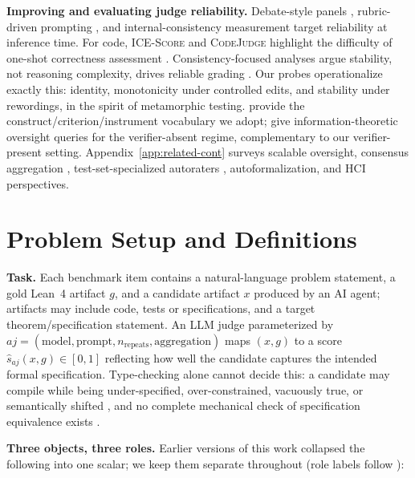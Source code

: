 \documentclass{article}
\begin{document}
\textbf{Improving and evaluating judge reliability.}
Debate-style panels \citep{Chan2024ChatEval}, rubric-driven prompting \citep{Liu2023GEval}, and internal-consistency measurement \citep{Li2024TrustLLMJudgments} target reliability at inference time.
For code, \textsc{ICE-Score} and \textsc{CodeJudge} highlight the difficulty of one-shot correctness assessment \citep{Zhuo2024ICEScore,TongZhang2024CodeJudge}.
Consistency-focused analyses argue stability, not reasoning complexity, drives reliable grading \citep{chen2026rethinking}.
Our probes operationalize exactly this: identity, monotonicity under controlled edits, and stability under rewordings, in the spirit of metamorphic testing.
\citet{salaudeen2025measurement} provide the construct/criterion/instrument vocabulary we adopt; \citet{robertson2025stepbystep} give information-theoretic oversight queries for the verifier-absent regime, complementary to our verifier-present setting.
Appendix~\ref{app:related-cont} surveys scalable oversight, consensus aggregation \citep{denisovblanch2026consensus}, test-set-specialized autoraters \citep{finkelstein2024specialist}, autoformalization, and HCI perspectives.

\section{Problem Setup and Definitions}\label{sec:defs}

\textbf{Task.}
Each benchmark item contains a natural-language problem statement, a gold Lean~4 artifact $g$, and a candidate artifact $x$ produced by an AI agent; artifacts may include code, tests or specifications, and a target theorem/specification statement.
An LLM judge parameterized by $aj = (\text{model}, \text{prompt}, n_{\mathrm{repeats}}, \text{aggregation})$ maps $(x,g)$ to a score $\hat{s}_{aj}(x,g) \in [0,1]$ reflecting how well the candidate captures the intended formal specification.
Type-checking alone cannot decide this: a candidate may compile while being under-specified, over-constrained, vacuously true, or semantically shifted \citep{miranda2026veribench}, and no complete mechanical check of specification equivalence exists \citep{rice1953}.

\textbf{Three objects, three roles.}
Earlier versions of this work collapsed the following into one scalar; we keep them separate throughout (role labels follow \citealp{salaudeen2025measurement}):
\end{document}
